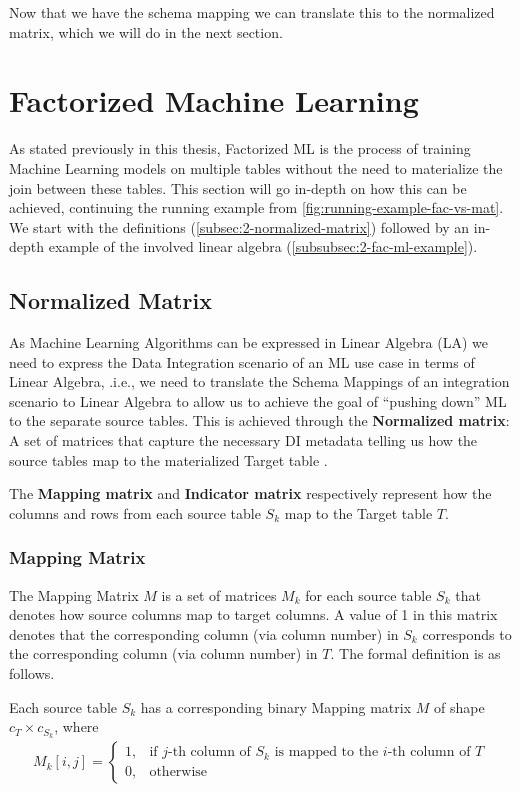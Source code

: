 Now that we have the schema mapping we can translate this to the normalized matrix, which we will do in the next section.

\section{Factorized Machine Learning}
\label{sec:2-factorized-ml}
As stated previously in this thesis, Factorized ML is the process of training Machine Learning models on multiple tables without the need to materialize the join between these tables. This section will go in-depth on how this can be achieved, continuing the running example from \autoref{fig:running-example-fac-vs-mat}.  We start with the definitions (\autoref{subsec:2-normalized-matrix}) followed by an in-depth example of the involved linear algebra (\autoref{subsubsec:2-fac-ml-example}).

\subsection{Normalized Matrix}
\label{subsec:2-normalized-matrix}

As Machine Learning Algorithms can be expressed in Linear Algebra (LA) we need to express the Data Integration scenario of an ML use case in terms of Linear Algebra, .i.e., we need to translate the Schema Mappings of an integration scenario to Linear Algebra to allow us to achieve the goal of “pushing down” ML to the separate source tables. This is achieved through the \textbf{ Normalized matrix}: A set of matrices that capture the necessary DI metadata telling us how the source tables map to the materialized Target table \cite{amalur, morpheus}.

The \textbf{Mapping matrix} and \textbf{Indicator matrix} respectively represent how the columns and rows from each source table $S_k$ map to the Target table $T$.

\subsubsection{Mapping Matrix}
The Mapping Matrix $M$ is a set of matrices $M_k$ for each source table $S_k$ that denotes how source columns map to target columns. A value of 1 in this matrix denotes that the corresponding column (via column number) in $S_k$ corresponds to the corresponding column (via column number) in $T$. The formal definition is as follows.

\begin{definition}
    Each source table $S_k$ has a corresponding binary Mapping matrix $M$ of shape $c_T \times c_{S_k}$, where
    \begin{align*}
        M_k[i,j] = \begin{cases}
                       1, & \text{if $j$-th column of $S_k$ is mapped to the $i$-th column of $T$} \\
                       0, & \text{otherwise}
                   \end{cases}
    \end{align*}
\end{definition}

